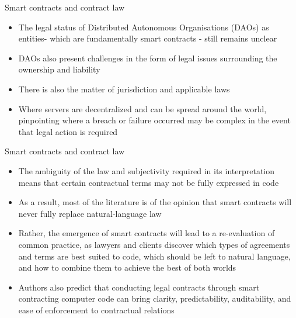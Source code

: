 \documentclass[11pt]{beamer}
\begin{document}
\begin{frame}{Smart contracts and contract law}
	\begin{itemize}
		\item The legal status of Distributed Autonomous Organisations (DAOs) as entities- which are fundamentally smart contracts - still remains unclear
		\item DAOs also present challenges in the form of legal issues surrounding the ownership and liability
		\item There is also the matter of jurisdiction and applicable laws
		\item Where servers are decentralized and can be spread around the world, pinpointing where a breach or failure occurred may be complex in the event that legal action is required
	\end{itemize}
\end{frame}



\begin{frame}{Smart contracts and contract law}
	\begin{itemize}
		\item The ambiguity of the law and subjectivity required in its interpretation means that certain contractual terms may not be fully expressed in code
		\item As a result, most of the literature is of the opinion that smart contracts will never fully replace natural-language law
		\item Rather, the emergence of smart contracts will lead to a re-evaluation of common practice, as lawyers and clients discover which types of agreements and terms are best suited to code, which should be left to natural language, and how to combine them to achieve the best of both worlds
		\item Authors also predict that conducting legal contracts through smart contracting computer code can bring clarity, predictability, auditability, and ease of enforcement to contractual relations
	\end{itemize}
\end{frame}
\end{document}
